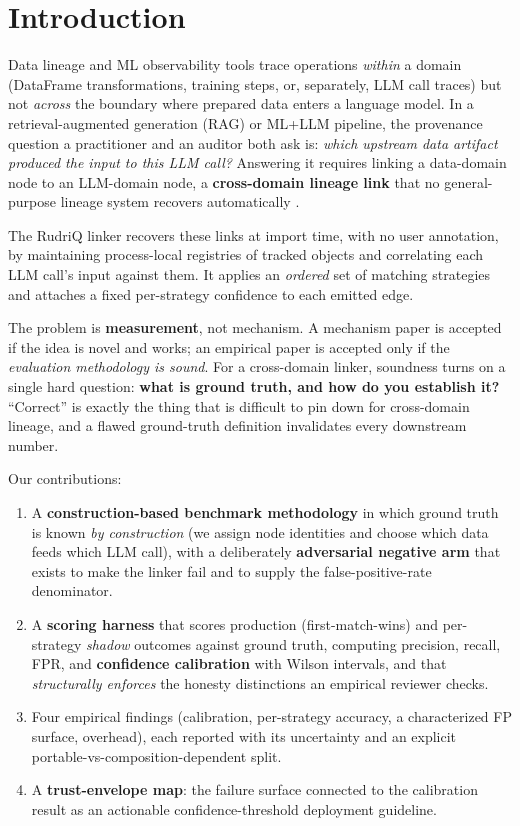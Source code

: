 \documentclass[11pt]{article}
\begin{document}
\section{Introduction}

Data lineage and ML observability tools trace operations \emph{within} a domain (DataFrame
transformations, training steps, or, separately, LLM call traces) but not \emph{across} the boundary
where prepared data enters a language model. In a retrieval-augmented generation (RAG) or ML+LLM pipeline,
the provenance question a practitioner and an auditor both ask is: \emph{which upstream data artifact
produced the input to this LLM call?} Answering it requires linking a data-domain node to an LLM-domain
node, a \textbf{cross-domain lineage link} that no general-purpose lineage system recovers automatically
\cite{openlineage,zaharia2018mlflow,openllmetry}.

The RudriQ linker recovers these links at import time, with no user annotation, by maintaining process-local
registries of tracked objects and correlating each LLM call's input against them. It applies an
\emph{ordered} set of matching strategies and attaches a fixed per-strategy confidence to each emitted edge.

The problem is \textbf{measurement}, not mechanism. A mechanism paper is accepted if the idea is novel and
works; an empirical paper is accepted only if the \emph{evaluation methodology is sound}. For a cross-domain
linker, soundness turns on a single hard question: \textbf{what is ground truth, and how do you establish
it?} ``Correct'' is exactly the thing that is difficult to pin down for cross-domain lineage, and a flawed
ground-truth definition invalidates every downstream number.

Our contributions:
\begin{enumerate}[leftmargin=*]
\item A \textbf{construction-based benchmark methodology} in which ground truth is known \emph{by
construction} (we assign node identities and choose which data feeds which LLM call), with a deliberately
\textbf{adversarial negative arm} that exists to make the linker fail and to supply the false-positive-rate
denominator.
\item A \textbf{scoring harness} that scores production (first-match-wins) and per-strategy \emph{shadow}
outcomes against ground truth, computing precision, recall, FPR, and \textbf{confidence calibration} with
Wilson intervals, and that \emph{structurally enforces} the honesty distinctions an empirical reviewer
checks.
\item Four empirical findings (calibration, per-strategy accuracy, a characterized FP surface, overhead),
each reported with its uncertainty and an explicit portable-vs-composition-dependent split.
\item A \textbf{trust-envelope map}: the failure surface connected to the calibration result as an
actionable confidence-threshold deployment guideline.
\end{enumerate}
\end{document}
